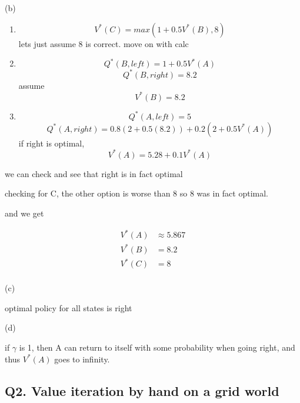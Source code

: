 \documentclass{report}
\begin{document}
(b)
\begin{enumerate}
    \item \begin{equation}
        V^*(C)=max(1+0.5V^*(B),8)
    \end{equation}
    lets just assume 8 is correct. move on with calc
    \item \begin{equation}
        Q^*(B,left)=1+0.5V^*(A)
    \end{equation}
    \begin{equation}
        Q^*(B,right)=8.2
    \end{equation}
    assume 
    \begin{equation}
        V^*(B)=8.2
    \end{equation}
    \item 
    \begin{equation}
        Q^*(A,left)=5
    \end{equation}
    \begin{equation}
        Q^*(A,right)=0.8(2+0.5(8.2))+0.2(2+0.5V^*(A))
    \end{equation}
    if right is optimal,
    \begin{equation}
        V^*(A)=5.28+0.1V^*(A)
    \end{equation}
\end{enumerate}

we can check and see that right is in fact optimal

checking for C, the other option is worse than 8 so 8 was in fact optimal.

and we get

\begin{equation}\begin{split}
        V^*(A) &\approx 5.867\\
        V^*(B) &= 8.2\\
        V^*(C) &= 8\\
\end{split}
\end{equation}

(c)

optimal policy for all states is right


(d)

if \(\gamma\) is 1, then A can return to itself with some probability when going right, and thus \(V^*(A)\) goes to infinity.

\subsection*{Q2. Value iteration by hand on a grid world}
\end{document}
